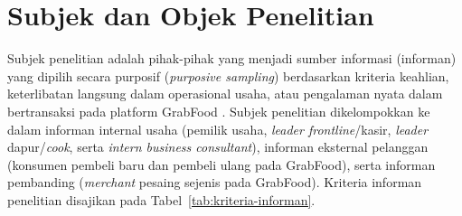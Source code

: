 \section{Subjek dan Objek Penelitian}
Subjek penelitian adalah pihak-pihak yang menjadi sumber informasi (informan) yang dipilih secara purposif (\textit{purposive sampling}) berdasarkan kriteria keahlian, keterlibatan langsung dalam operasional usaha, atau pengalaman nyata dalam bertransaksi pada platform GrabFood \parencite{creswell2018qualitativeinquiry,patton2015qualitativeevaluation}. Subjek penelitian dikelompokkan ke dalam informan internal usaha (pemilik usaha, \textit{leader frontline}/kasir, \textit{leader} dapur/\textit{cook}, serta \textit{intern business consultant}), informan eksternal pelanggan (konsumen pembeli baru dan pembeli ulang pada GrabFood), serta informan pembanding (\textit{merchant} pesaing sejenis pada GrabFood). Kriteria informan penelitian disajikan pada Tabel~\ref{tab:kriteria-informan}.

